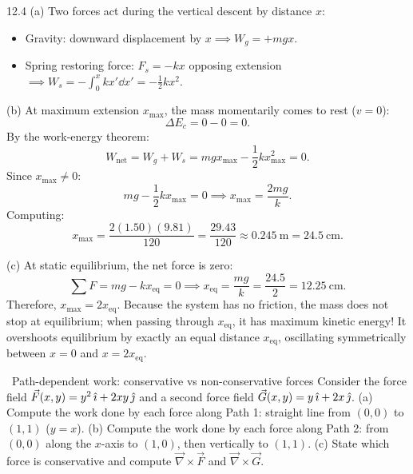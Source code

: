 \begin{solution}{12.4}
(a) Two forces act during the vertical descent by distance $x$:
\begin{itemize}[leftmargin=1.4em,itemsep=2pt]
  \item Gravity: downward displacement by $x \implies W_g = +mgx$.
  \item Spring restoring force: $F_s = -kx$ opposing extension $\implies W_s = -\int_0^x kx'\dd x' = -\frac{1}{2}kx^2$.
\end{itemize}

(b) At maximum extension $x_{\max}$, the mass momentarily comes to rest ($v = 0$):
\[
\Delta E_c = 0 - 0 = 0.
\]
By the work-energy theorem:
\[
W_{\text{net}} = W_g + W_s = mgx_{\max} - \frac{1}{2}kx_{\max}^2 = 0.
\]
Since $x_{\max} \ne 0$:
\[
mg - \frac{1}{2}kx_{\max} = 0 \implies \boxed{x_{\max} = \frac{2mg}{k}.}
\]
Computing:
\[
x_{\max} = \frac{2(1.50)(9.81)}{120} = \frac{29.43}{120} \approx \mathbf{0.245\ \mathrm{m}} = 24.5\ \mathrm{cm}.
\]

(c) At static equilibrium, the net force is zero:
\[
\sum F = mg - kx_{\text{eq}} = 0 \implies x_{\text{eq}} = \frac{mg}{k} = \frac{24.5}{2} = 12.25\ \mathrm{cm}.
\]
Therefore, $x_{\max} = 2x_{\text{eq}}$.
Because the system has no friction, the mass does not stop at equilibrium; when passing through $x_{\text{eq}}$, it has maximum kinetic energy! It overshoots equilibrium by exactly an equal distance $x_{\text{eq}}$, oscillating symmetrically between $x=0$ and $x=2x_{\text{eq}}$.
\end{solution}

\begin{exercise}{\core\ Path-dependent work: conservative vs non-conservative forces}
Consider the force field $\vec{F}(x, y) = y^2\,\hat{\imath} + 2xy\,\hat{\jmath}$ and a second force field $\vec{G}(x, y) = y\,\hat{\imath} + 2x\,\hat{\jmath}$.
(a) Compute the work done by each force along Path 1: straight line from $(0,0)$ to $(1,1)$ ($y = x$).
(b) Compute the work done by each force along Path 2: from $(0,0)$ along the $x$-axis to $(1,0)$, then vertically to $(1,1)$.
(c) State which force is conservative and compute $\vec{\nabla}\times\vec{F}$ and $\vec{\nabla}\times\vec{G}$.
\end{exercise}

\begin{tabletworkspace}[6.5cm]
\end{tabletworkspace}

